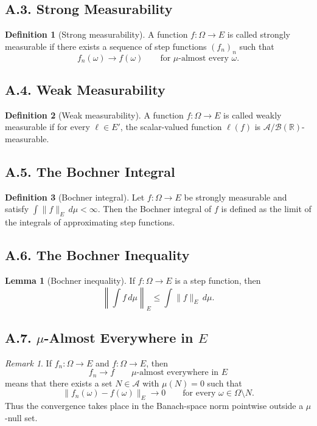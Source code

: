 \documentclass[11pt]{article}
\theoremstyle{definition}
\newtheorem{definition}{Definition}
\newtheorem{lemma}{Lemma}
\theoremstyle{remark}
\newtheorem{remark}{Remark}
\begin{document}
\subsection*{A.3. Strong Measurability}
\begin{definition}[Strong measurability]
A function \(f:\Omega\to E\) is called strongly measurable if there exists a sequence of step functions \((f_n)_n\) such that
\[
f_n(\omega)\to f(\omega)
\qquad \text{for } \mu\text{-almost every } \omega.
\]
\end{definition}

\subsection*{A.4. Weak Measurability}
\begin{definition}[Weak measurability]
A function \(f:\Omega\to E\) is called weakly measurable if for every \(\ell\in E'\), the scalar-valued function \(\ell(f)\) is \(\mathcal A/\mathcal B(\mathbb R)\)-measurable.
\end{definition}

\subsection*{A.5. The Bochner Integral}
\begin{definition}[Bochner integral]
Let \(f:\Omega\to E\) be strongly measurable and satisfy \(\int \|f\|_E\,d\mu<\infty\).
Then the Bochner integral of \(f\) is defined as the limit of the integrals of approximating step functions.
\end{definition}

\subsection*{A.6. The Bochner Inequality}
\begin{lemma}[Bochner inequality]
If \(f:\Omega\to E\) is a step function, then
\[
\left\|\int f\,d\mu\right\|_E\le \int \|f\|_E\,d\mu.
\]
\end{lemma}

\subsection*{A.7. \(\mu\)-Almost Everywhere in \(E\)}
\begin{remark}
If \(f_n:\Omega\to E\) and \(f:\Omega\to E\), then
\[
f_n\to f
\qquad \mu\text{-almost everywhere in } E
\]
means that there exists a set \(N\in\mathcal A\) with \(\mu(N)=0\) such that
\[
\|f_n(\omega)-f(\omega)\|_E\to 0
\qquad \text{for every } \omega\in \Omega\setminus N.
\]
Thus the convergence takes place in the Banach-space norm pointwise outside a \(\mu\)-null set.
\end{remark}
\end{document}
